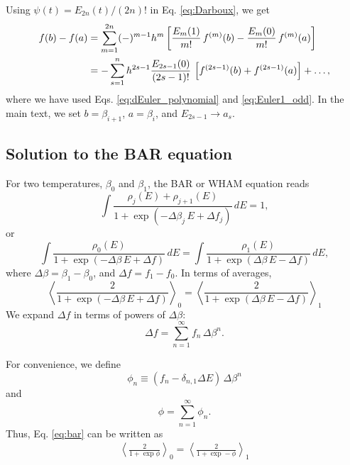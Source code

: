 \documentclass[aip,jcp,preprint,notitlepage, superscriptaddress]{revtex4-1}
\begin{document}
Using $\psi(t) = E_{2n}(t)/(2n)!$ in Eq. \eqref{eq:Darboux},
we get
\begin{align}
f(b) - f(a)
&=
\sum_{m = 1}^{2n}
  (-)^{m - 1} h^m
  \left[
    \frac{ E_m(1) } {m!} \, f^{(m)}(b)
    -
    \frac{ E_m(0) } {m!} \, f^{(m)}(a)
  \right]
\notag \\
&=
-\sum_{s = 1}^{n}
h^{2 s - 1}
\frac{ E_{2 s - 1}(0) }{ (2 s - 1)! }
    \, \left[f^{(2 s - 1)}(b) + f^{(2 s - 1)}(a)\right]
  + \dots,
\label{eq:Darboux_Euler}
\end{align}
where we have used
Eqs. \eqref{eq:dEuler_polynomial} and \eqref{eq:Euler1_odd}.
%
In the main text,
we set $b = \beta_{i + 1}$,
$a = \beta_i$,
and $E_{2s - 1} \rightarrow a_s$.



\subsection{Solution to the BAR equation}



For two temperatures, $\beta_0$ and $\beta_1$,
the BAR or WHAM equation reads
%
\begin{equation*}
\int
  \frac{ \rho_j(E) + \rho_{j+1}(E) }
  { 1 + \exp( -\Delta \beta_j \, E + \Delta f_j ) }
  \, d E
= 1,
\end{equation*}
%
or
%
\begin{equation*}
\int
  \frac{ \rho_0(E) }
  { 1 + \exp( -\Delta \beta \, E + \Delta f ) }
  \, d E
=
\int
  \frac{ \rho_1(E) }
  { 1 + \exp( \Delta \beta \, E - \Delta f ) }
  \, d E,
\end{equation*}
%
where
$\Delta \beta = \beta_1 - \beta_0$,
and
$\Delta f = f_1 - f_0$.
%
In terms of averages,
\begin{equation}
\left\langle
  \frac{ 2 }
  { 1 + \exp( -\Delta \beta \, E + \Delta f ) }
\right\rangle_0
=
\left\langle
  \frac{ 2 }
  { 1 + \exp( \Delta \beta \, E - \Delta f ) }
\right\rangle_1
\label{eq:bar}
\end{equation}
%
We expand $\Delta f$ in terms of powers of $\Delta \beta$:
\[
\Delta f
=
\sum_{n = 1}^\infty f_n \, \Delta \beta^n.
\]



For convenience,
we define
\[
\phi_n \equiv (f_n - \delta_{n,1} \Delta E) \, \Delta \beta^n
\]
and
\[
\phi = \sum_{n = 1}^\infty \phi_n.
\]
Thus, Eq. \eqref{eq:bar} can be written as
\begin{align*}
\left\langle
  \frac{ 2 }
  { 1 + \exp \phi  }
\right\rangle_0
=
\left\langle
  \frac{ 2 }
  { 1 + \exp -\phi }
\right\rangle_1
\label{eq:bar1}
\end{align*}
\end{document}
